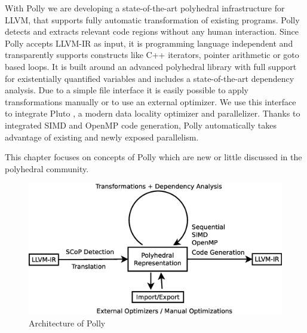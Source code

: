 With Polly we are developing a state-of-the-art polyhedral infrastructure for
LLVM, that supports fully automatic transformation of existing programs. Polly
detects and extracts relevant code regions without any human interaction. Since
Polly accepts LLVM-IR as input, it is programming language independent and
transparently supports constructs like C++ iterators, pointer arithmetic or
goto based loops. It is built around an advanced polyhedral library with full
support for existentially quantified variables and includes a state-of-the-art
dependency analysis. Due to a simple file interface it is easily possible to
apply transformations manually or to use an external optimizer. We use this
interface to integrate Pluto \cite{uday08pldi}, a modern data locality
optimizer and parallelizer. Thanks to integrated SIMD and OpenMP code
generation, Polly automatically takes advantage of existing and newly exposed
parallelism.

This chapter focuses on concepts of Polly which are new or little discussed in the polyhedral community.

\begin{figure}
  \label{fig:architecture}
  \includegraphics[width=1\textwidth]{images/architecture.eps}
  \caption{Architecture of Polly}
\end{figure}

